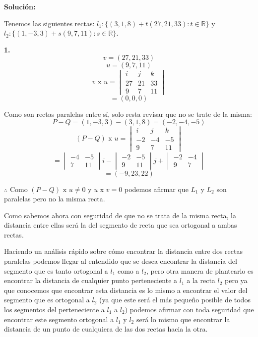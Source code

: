 \documentclass{article}
\begin{document}
\textbf{Solución:}
\vspace{10pt}


Tenemos las siguientes rectas: $l_1: \{(3, 1, 8)+t(27,21,33): t \in \mathbb{R}\}$ y $l_2: \{(1,-3,3)+s(9,7,11): s \in \mathbb{R}\}$.


\begin{minipage}[c]{0.5cm}
   \textbf{1.}
   $$v =(27, 21, 33)$$
   $$u =(9,7,11)$$
   $$v \text{ x } u = \begin{vmatrix}
       i & j & k \\
       27 & 21 & 33 \\
       9 & 7 & 11
   \end{vmatrix}$$
   $$=(0, 0, 0)$$
\end{minipage}


Como son rectas paralelas entre sí, solo resta revisar que no se trate de la misma:
$$P-Q = (1,-3,3)- (3,1,8) = (-2, -4, -5 )$$
   $$(P-Q) \text{ x } u = \begin{vmatrix}
       i & j & k \\
       -2 & -4 & -5 \\
       9 & 7 & 11
   \end{vmatrix}$$
   $$= \begin{vmatrix}
       -4 & -5 \\
       7 & 11
   \end{vmatrix}i - \begin{vmatrix}
       -2 & -5 \\
       9 & 11
   \end{vmatrix}j + \begin{vmatrix}
       -2 & -4 \\
       9 & 7
   \end{vmatrix}$$
   $$=(-9, 23, 22)$$


$\therefore$ Como $(P-Q) \text{ x } u\neq 0$ y $ u \text{ x } v= 0 $ podemos afirmar que $L_1$ y $L_2$ son paralelas
pero no la misma recta.


Como sabemos ahora con seguridad de que no se trata de la misma recta, la distancia entre ellas será la del segmento de recta que
sea ortogonal a ambas rectas.


Haciendo un análisis rápido sobre cómo encontrar la distancia entre dos rectas paralelas podemos llegar al entendido que se desea encontrar
la distancia del segmento que es tanto ortogonal a $l_1$ como a $l_2$, pero otra manera de plantearlo es encontrar la distancia de cualquier punto
perteneciente a $l_1$ a la recta $l_2$ pero ya que conocemos que encontrar esta distancia es lo mismo a encontrar el valor del segmento que es ortogonal
a $l_2$ (ya que este será el más pequeño posible de todos los segmentos del perteneciente a $l_1$ a $l_2$) podemos afirmar con toda seguridad que encontrar
este segmento ortogonal a $l_1$ y $l_2$ será lo mismo que encontrar la distancia de un punto de cualquiera de las dos rectas hacia la otra.
\par
\end{document}

